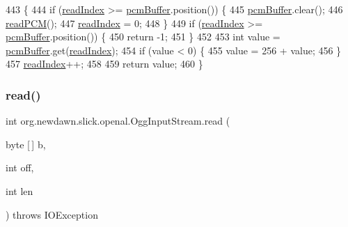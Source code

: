 \begin{DoxyCode}
443                                          \{
444         \textcolor{keywordflow}{if} (\mbox{\hyperlink{classorg_1_1newdawn_1_1slick_1_1openal_1_1_ogg_input_stream_a53b520bae4c31d5889485a0424f04478}{readIndex}} >= \mbox{\hyperlink{classorg_1_1newdawn_1_1slick_1_1openal_1_1_ogg_input_stream_a94fa1c1b12bc33364d2d885c537cc232}{pcmBuffer}}.position()) \{
445             \mbox{\hyperlink{classorg_1_1newdawn_1_1slick_1_1openal_1_1_ogg_input_stream_a94fa1c1b12bc33364d2d885c537cc232}{pcmBuffer}}.clear();
446             \mbox{\hyperlink{classorg_1_1newdawn_1_1slick_1_1openal_1_1_ogg_input_stream_ac65475d928528fa2e69dee80131f29a8}{readPCM}}();
447             \mbox{\hyperlink{classorg_1_1newdawn_1_1slick_1_1openal_1_1_ogg_input_stream_a53b520bae4c31d5889485a0424f04478}{readIndex}} = 0;
448         \}
449         \textcolor{keywordflow}{if} (\mbox{\hyperlink{classorg_1_1newdawn_1_1slick_1_1openal_1_1_ogg_input_stream_a53b520bae4c31d5889485a0424f04478}{readIndex}} >= \mbox{\hyperlink{classorg_1_1newdawn_1_1slick_1_1openal_1_1_ogg_input_stream_a94fa1c1b12bc33364d2d885c537cc232}{pcmBuffer}}.position()) \{
450             \textcolor{keywordflow}{return} -1;
451         \}
452 
453         \textcolor{keywordtype}{int} value = \mbox{\hyperlink{classorg_1_1newdawn_1_1slick_1_1openal_1_1_ogg_input_stream_a94fa1c1b12bc33364d2d885c537cc232}{pcmBuffer}}.get(\mbox{\hyperlink{classorg_1_1newdawn_1_1slick_1_1openal_1_1_ogg_input_stream_a53b520bae4c31d5889485a0424f04478}{readIndex}});
454         \textcolor{keywordflow}{if} (value < 0) \{
455             value = 256 + value;
456         \}
457         \mbox{\hyperlink{classorg_1_1newdawn_1_1slick_1_1openal_1_1_ogg_input_stream_a53b520bae4c31d5889485a0424f04478}{readIndex}}++;
458         
459         \textcolor{keywordflow}{return} value;
460     \}
\end{DoxyCode}
\mbox{\label{classorg_1_1newdawn_1_1slick_1_1openal_1_1_ogg_input_stream_ab03aec502a7165b31f7fcb1fbb596a5f}} 
\subsubsection{\texorpdfstring{read()}{read()}\hspace{0.1cm}{\footnotesize\ttfamily [2/3]}}
{\footnotesize\ttfamily int org.\+newdawn.\+slick.\+openal.\+Ogg\+Input\+Stream.\+read (\begin{DoxyParamCaption}\item[{byte \mbox{[}$\,$\mbox{]}}]{b,  }\item[{int}]{off,  }\item[{int}]{len }\end{DoxyParamCaption}) throws I\+O\+Exception\hspace{0.3cm}{\ttfamily [inline]}}

